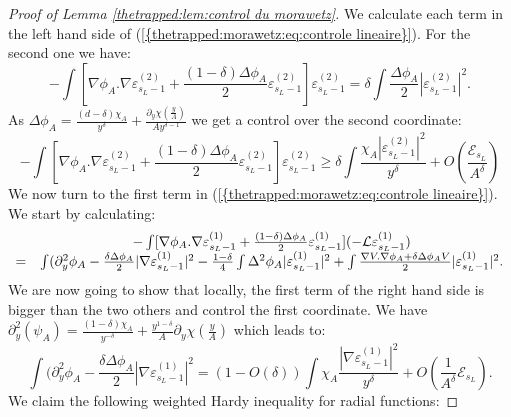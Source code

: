 \documentclass[11pt,a4paper,reqno]{amsart}
\theoremstyle{remark}
\numberwithin{equation}{section}
\begin{document}
\begin{proof}[Proof of Lemma \ref{thetrapped:lem:control du morawetz}]
We calculate each term in the left hand side of {{\rm (\ref{{thetrapped:morawetz:eq:controle lineaire}})}}. For the second one we have:
$$
-\int [\nabla \phi_A .\nabla \varepsilon^{(2)}_{s_L-1}+\frac{(1-\delta)\Delta \phi_A}{2}\varepsilon^{(2)}_{s_L-1}] \varepsilon^{(2)}_{s_L-1}=\delta \int \frac{\Delta \phi_A}{2}|\varepsilon^{(2)}_{s_L-1}|^2.
$$
As $\Delta \phi_A= \frac{(d-\delta)\chi_A}{y^{\delta}}+\frac{\partial_y \chi \left( \frac{y}{A}\right)}{Ay^{\delta-1}}$ we get a control over the second coordinate:
\begin{equation} \label{thetrapped:morawetz:eq:controle lineaire 2}
-\int [\nabla \phi_A .\nabla \varepsilon^{(2)}_{s_L-1}+\frac{(1-\delta)\Delta \phi_A}{2}\varepsilon^{(2)}_{s_L-1}] \varepsilon^{(2)}_{s_L-1}\geq \delta \int \frac{\chi_A |\varepsilon^{(2)}_{s_L-1}|^2}{y^{\delta}}+O\left(\frac{\mathcal{E}_{s_L}}{A^{\delta}} \right)
\end{equation}
We now turn to the first term in {{\rm (\ref{{thetrapped:morawetz:eq:controle lineaire}})}}. We start by calculating:
\begin{equation} \label{thetrapped:morawetz:eq:terme 1 intermediaire}
\begin{array}{r c l}
&-\int [\nabla \phi_A .\nabla \varepsilon^{(1)}_{s_L-1}+\frac{(1-\delta)\Delta \phi_A}{2}\varepsilon^{(1)}_{s_L-1}] (-\mathcal{L}\varepsilon^{(1)}_{s_L-1})\\
=&\int (\partial_y^2 \phi_A-\frac{\delta \Delta \phi_A}{2} |\nabla \varepsilon^{(1)}_{s_L-1}|^2-\frac{1-\delta}{4}\int \Delta^2 \phi_A |\varepsilon^{(1)}_{s_L-1}|^2+\int \frac{\nabla V.\nabla \phi_A+\delta \Delta \phi_A V}{2} |\varepsilon^{(1)}_{s_L-1}|^2 .
\end{array}
\end{equation}
We are now going to show that locally, the first term of the right hand side is bigger than the two others and control the first coordinate. We have $\partial_y^2 (\psi_A)=\frac{(1-\delta)\chi_A}{y^{-\delta}}+\frac{y^{1-\delta}}{A}\partial_y \chi (\frac{y}{A})$ which leads to:
\begin{equation} \label{thetrapped:morawetz:terme gradient inte}
\int (\partial_y^2 \phi_A-\frac{\delta \Delta \phi_A}{2} |\nabla \varepsilon^{(1)}_{s_L-1}|^2=(1-O(\delta))\int \chi_A \frac{|\nabla \varepsilon^{(1)}_{s_L-1}|^2}{y^{\delta}} + O\left( \frac{1}{A^{\delta}}\mathcal{E}_{s_L} \right).
\end{equation}
We claim the following weighted Hardy inequality for radial functions:

\end{proof}
\end{document}
